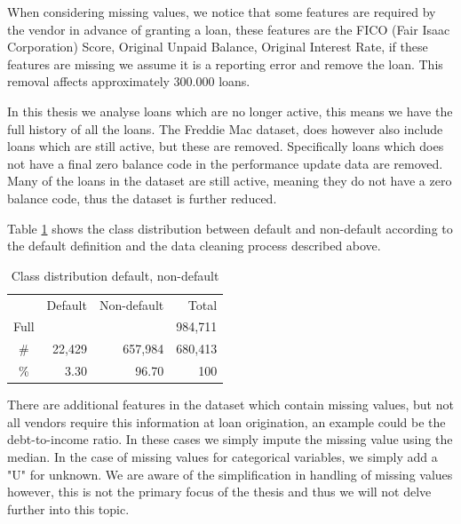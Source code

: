 When considering missing values, we notice that some features are required by the vendor in advance of granting a loan, these features are the FICO (Fair Isaac Corporation) Score, Original Unpaid Balance, Original Interest Rate, if these features are missing we assume it is a reporting error and remove the loan. This removal affects approximately 300.000 loans. 

In this thesis we analyse loans which are no longer active, this means we have the full history of all the loans. The Freddie Mac dataset, does however also include loans which are still active, but these are removed. 
Specifically loans which does not have a final zero balance code in the performance update data are removed. Many of the loans in the dataset are still active, meaning they do not have a zero balance code, thus the dataset is further reduced. 

Table \ref{tab:default_amount} shows the class distribution between default and non-default according to the default definition and the data cleaning process described above. 

\begin{table}[H]
    \centering
    \caption{Class distribution default, non-default}
    \label{tab:default_amount}
    \begin{tabular}{crrr}
    \toprule
         & Default & Non-default & Total\\
         Full & & & 984,711 \\
         \# &  22,429 & 657,984 & 680,413\\
         \% &  3.30 & 96.70 & 100\\
        \bottomrule
    \end{tabular}
    \end{table}

There are additional features in the dataset which contain missing values, but not all vendors require this information at loan origination, an example could be the debt-to-income ratio. In these cases we simply impute the missing value using the median. In the case of missing values for categorical variables, we simply add a "U" for unknown. We are aware of the simplification in handling of missing values however, this is not the primary focus of the thesis and thus we will not delve further into this topic. 


